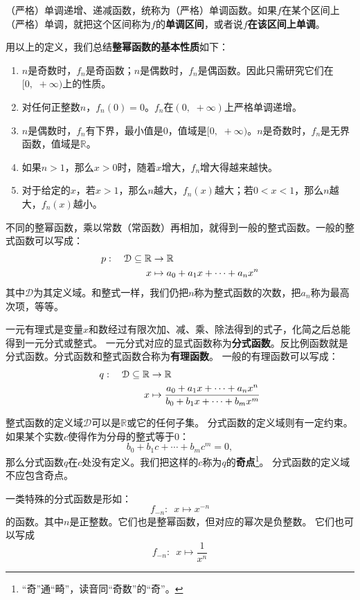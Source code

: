 \documentclass[12pt,UTF8]{ctexbook}
\begin{document}
（严格）单调递增、递减函数，统称为（严格）单调函数。如果$f$在某个区间上（严格）单调，就把这个区间称为$f$的\textbf{单调区间}，或者说$f$\textbf{在该区间上单调}。

用以上的定义，我们总结\textbf{整幂函数的基本性质}如下：
\begin{enumerate}
    \item $n$是奇数时，$f_n$是奇函数；$n$是偶数时，$f_n$是偶函数。因此只需研究它们在$[0, \,\, +\infty)$上的性质。
    \item 对任何正整数$n$，$f_n(0) = 0$。$f_n$在$(0, \,\, +\infty)$上严格单调递增。
    \item $n$是偶数时，$f_n$有下界，最小值是$0$，值域是$[0, \,\, +\infty)$。$n$是奇数时，$f_n$是无界函数，值域是$\mathbb{R}$。
    \item 如果$n>1$，那么$x>0$时，随着$x$增大，$f_n$增大得越来越快。
    \item 对于给定的$x$，若$x>1$，那么$n$越大，$f_n(x)$越大；若$0 < x<1$，那么$n$越大，$f_n(x)$越小。
\end{enumerate}

不同的整幂函数，乘以常数（常函数）再相加，就得到一般的整式函数。一般的整式函数可以写成：
\begin{align}
    p: \quad \mathcal{D} \subseteq \mathbb{R} &\rightarrow \mathbb{R} \notag \\
    x &\mapsto a_0 + a_1 x + \cdots + a_n x^n \notag
\end{align}
其中$\mathcal{D}$为其定义域。和整式一样，我们仍把$n$称为整式函数的次数，把$a_n$称为最高次项，等等。

一元有理式是变量$x$和数经过有限次加、减、乘、除法得到的式子，化简之后总能得到一元分式或整式。
一元分式对应的显式函数称为\textbf{分式函数}。反比例函数就是分式函数。分式函数和整式函数合称为\textbf{有理函数}。
一般的有理函数可以写成：
\begin{align}
    q: \quad \mathcal{D} \subseteq \mathbb{R} &\rightarrow \mathbb{R} \notag \\
    x &\mapsto \frac{a_0 + a_1 x + \cdots + a_n x^n}{b_0 + b_1x + \cdots + b_mx^m} \notag
\end{align}

整式函数的定义域$\mathcal{D}$可以是$\mathbb{R}$或它的任何子集。
分式函数的定义域则有一定约束。如果某个实数$c$使得作为分母的整式等于$0$：
$$ b_0 + b_1c + \cdots + b_m c^m = 0, $$
那么分式函数$q$在$c$处没有定义。我们把这样的$c$称为$q$的\textbf{奇点}\footnote{“奇”通“畸”，读音同“奇数”的“奇”。}。
分式函数的定义域不应包含奇点。

一类特殊的分式函数是形如：
$$ f_{-n} : \,\,\, x \mapsto x^{-n}$$
的函数。其中$n$是正整数。它们也是整幂函数，但对应的幂次是负整数。
它们也可以写成
$$ f_{-n} : \,\,\, x \mapsto \frac{1}{x^n}$$
\end{document}
